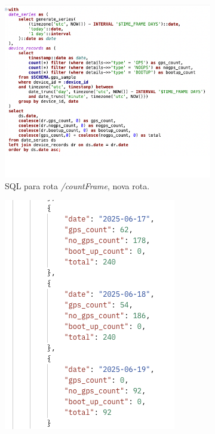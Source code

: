\begin{figure}[!h]
	\centering
	\begin{subfigure}[c]{0.45\textwidth}
		\centering
		\includegraphics[width=\textwidth]{figs/sqlCountFrame.png}
		\caption{SQL para rota \textit{/countFrame}, nova rota.}
		\label{fig:sqlCountDaily}
	\end{subfigure}
	\hfill
	\begin{subfigure}[c]{0.45\textwidth}
        \centering
        \includegraphics[width=\textwidth]{figs/return_new_query.png}

\end{subfigure}
\end{figure}
